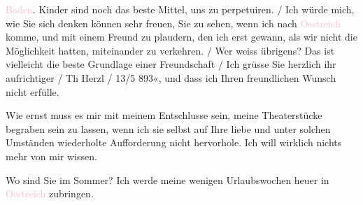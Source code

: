 {{{                           \textcolor{pink}{Baden}. Kinder sind noch das beste
                        Mittel, uns zu perpetuiren.{ / }Ich würde mich, wie Sie sich denken können sehr freuen, Sie zu sehen, wenn
                        ich nach \textcolor{pink}{Oestreich} komme, und mit einem
                        Freund zu plaudern, den ich erst gewann, als wir nicht die Möglichkeit
                        hatten, miteinander zu verkehren.{ / }Wer weiss übrigens? Das ist vielleicht die beste Grundlage einer
                        Freundschaft{ / }Ich grüsse Sie herzlich ihr aufrichtiger{ / }Th Herzl{ / }13/5 893«}}}\label{K_L03829-1}, und dass ich Ihren freundlichen Wunsch nicht erfülle.\pend
           
\pstart
           Wie ernst muss es mir mit meinem Entschlusse sein, meine Theaterstücke begraben sein
               zu lassen, wenn ich sie selbst auf Ihre liebe und unter solchen Umständen wiederholte
               Aufforderung nicht hervorhole. Ich will wirklich nichts mehr von mir wissen.\pend
           
\pstart
           {\pb}Wo sind Sie im Sommer? Ich
               werde meine wenigen Urlaubswochen heuer in \textcolor{pink}{Oestreich}\ledrightnote{\textcolor{pink}{Österreich}} zubringen.\pend
           
